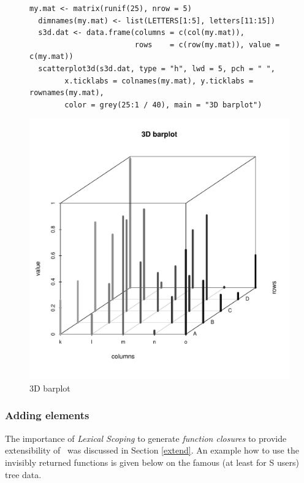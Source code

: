 \enlargethispage{1cm}
\vspace*{5mm}
\begin{figure}[htb!]
\small
\begin{Verbatim}[frame=single]
  my.mat <- matrix(runif(25), nrow = 5)
  dimnames(my.mat) <- list(LETTERS[1:5], letters[11:15])
  s3d.dat <- data.frame(columns = c(col(my.mat)),
                        rows    = c(row(my.mat)), value = c(my.mat))
  scatterplot3d(s3d.dat, type = "h", lwd = 5, pch = " ",
        x.ticklabs = colnames(my.mat), y.ticklabs = rownames(my.mat),
        color = grey(25:1 / 40), main = "3D barplot")
\end{Verbatim}
\normalsize
\begin{center}
\includegraphics[width=12.5cm]{barplot}
\end{center}
\vspace*{-10mm}\caption{3D barplot\label{barplot}}
\end{figure}


\clearpage\subsubsection{Adding elements}
The importance of \textsl{Lexical Scoping} to generate \textsl{function closures}
to provide extensibility of \sdd\ was discussed in Section \ref{extend}.
An example how to use the invisibly returned functions is given below on the famous
(at least for \textsf{S} users) tree data.

